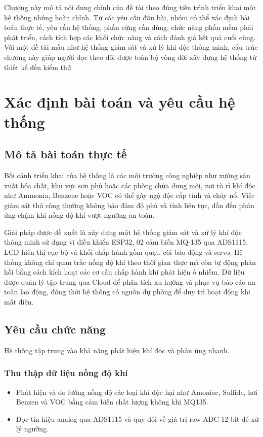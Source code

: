 \documentclass[../BTL_PTIT.tex]{subfiles}
\begin{document}
Chương này mô tả nội dung chính của đề tài theo đúng tiến trình triển khai một hệ thống nhúng hoàn chỉnh. Từ các yêu cầu đầu bài, nhóm có thể xác định bài toán thực tế, yêu cầu hệ thống, phần cứng cần dùng, chức năng phần mềm phải phát triển, cách tích hợp các khối chức năng và cách đánh giá kết quả cuối cùng. Với một đề tài mẫu như hệ thống giám sát và xử lý khí độc thông minh, cấu trúc chương này giúp người đọc theo dõi được toàn bộ vòng đời xây dựng hệ thống từ thiết kế đến kiểm thử.

\section{Xác định bài toán và yêu cầu hệ thống}

\subsection{Mô tả bài toán thực tế}
Bối cảnh triển khai của hệ thống là các môi trường công nghiệp như xưởng sản xuất hóa chất, khu vực sơn phủ hoặc các phòng chứa dung môi, nơi rò rỉ khí độc như Ammonia, Benzene hoặc VOC có thể gây ngộ độc cấp tính và cháy nổ. Việc giám sát thủ công thường không bảo đảm độ phủ và tính liên tục, dẫn đến phản ứng chậm khi nồng độ khí vượt ngưỡng an toàn.

Giải pháp được đề xuất là xây dựng một hệ thống giám sát và xử lý khí độc thông minh sử dụng vi điều khiển ESP32, 02 cảm biến MQ-135 qua ADS1115, LCD hiển thị cục bộ và khối chấp hành gồm quạt, còi báo động và servo. Hệ thống không chỉ quan trắc nồng độ khí theo thời gian thực mà còn tự động phản hồi bằng cách kích hoạt các cơ cấu chấp hành khi phát hiện ô nhiễm. Dữ liệu được quản lý tập trung qua Cloud để phân tích xu hướng và phục vụ báo cáo an toàn lao động, đồng thời hệ thống có nguồn dự phòng để duy trì hoạt động khi mất điện.

\subsection{Yêu cầu chức năng}
Hệ thống tập trung vào khả năng phát hiện khí độc và phản ứng nhanh.

\subsubsection{Thu thập dữ liệu nồng độ khí}
\begin{itemize}
    \item Phát hiện và đo lường nồng độ các loại khí độc hại như Amoniac, Sulfide, hơi Benzen và VOC bằng cảm biến chất lượng không khí MQ135.
    \item Đọc tín hiệu analog qua ADS1115 và quy đổi về giá trị raw ADC 12-bit để xử lý ngưỡng.
\end{itemize}
\end{document}
